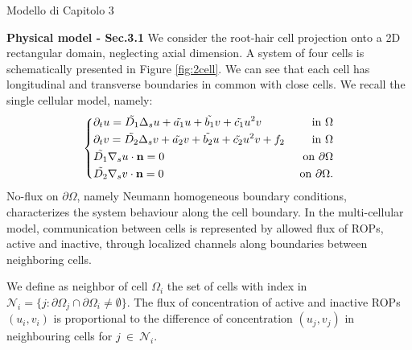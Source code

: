 \documentclass[a4paper]{siamart190516}
\begin{document}
Modello di Capitolo 3

\textbf{Physical model - Sec.3.1}
We consider the root-hair cell projection onto a 2D rectangular domain, neglecting axial dimension.
A system of four cells is schematically presented in Figure \ref{fig:2cell}. We can see that each cell has longitudinal and transverse boundaries in common with close cells.
We recall the single cellular model, namely:
\begin{equation} \label{eq:singModel}
\left\lbrace
\begin{matrix}
  \begin{aligned}
    & \partial_t u = \Tilde{D_1} \Delta_s u + \Tilde{a_1} u + \Tilde{b_1} v + \Tilde{c_1} u^2 v & \ \text{in} \ \Omega\\
    & \partial_t v = \Tilde{D_2} \Delta_s v + \Tilde{a_2} v + \Tilde{b_2} u + \Tilde{c_2} u^2 v + f_2 & \ \text{in} \ \Omega \\
    & \Tilde{D_1} \nabla_s u \cdot \mathbf{n} = 0 & \ \text{on} \ \partial \Omega \\
    & \Tilde{D_2} \nabla_s v \cdot \mathbf{n} = 0 & \ \text{on} \ \partial \Omega.
  \end{aligned}
\end{matrix}
\right.
\end{equation}
No-flux on $\partial \Omega$, namely Neumann homogeneous boundary conditions, characterizes the system behaviour along the cell boundary.
In the multi-cellular model, communication between cells is represented by allowed flux of ROPs, active and inactive, through localized channels along boundaries between neighboring cells.

We define as neighbor of cell $\Omega_i$ the set of cells with index in $\mathcal{N}_i = \{ j : \partial \Omega_j  \cap \partial \Omega_i \neq \emptyset \}$. The flux of concentration of active and inactive ROPs $(u_i, v_i)$ is proportional to the difference of concentration $(u_j, v_j)$ in neighbouring cells for $j \ \in \ \mathcal{N}_i$.
\end{document}
